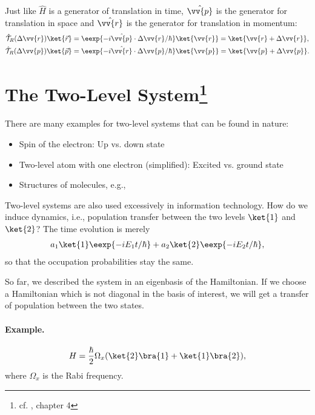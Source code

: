 				Just like $\hat{H}$ is a generator of translation in time, $\hat{\vv{p}}$ is the generator for translation in space and $\hat{\vv{r}}$ is the generator for translation in momentum:
				\begin{align}
					\hat{\mathcal{T}}_R(\Delta{\vv{r}}) \ket{\vec{r}} &= \eexp{-i\hat{\vv{p}}\cdot{\Delta\vv{r}}/{\hbar}}\ket{\vv{r}}=\ket{\vv{r}+\Delta\vv{r}},\\
					\hat{\mathcal{T}}_R(\Delta{\vv{p}}) \ket{\vec{p}} &= \eexp{-i\hat{\vv{r}}\cdot{\Delta\vv{p}}/{\hbar}}\ket{\vv{p}}=\ket{\vv{p}+\Delta\vv{p}}.
				\end{align}


	\section[The Two-Level System]{The Two-Level System\footnote{cf. \cite{cohen}, chapter 4}}

		There are many examples for two-level systems that can be found in nature:
		\begin{itemize}
			\item Spin of the electron: Up vs. down state
			\item Two-level atom with one electron (simplified): Excited vs. ground state
			\item Structures of molecules, e.g., \hyperref[fig:twostate]{}
		\end{itemize}
		Two-level systems are also used excessively in information technology.
		How do we induce dynamics, i.e., population transfer between the two levels $\ket{1}$ and $\ket{2}$? The time evolution is merely
		\begin{align}
			a_1\ket{1}\eexp{-i{E_1 t}/{\hbar}} + a_2\ket{2}\eexp{-i{E_2 t}/{\hbar}},
		\end{align}
		so that the occupation probabilities stay the same. 
		
		So far, we described the system in an eigenbasis of the Hamiltonian.
		If we choose a Hamiltonian which is not diagonal in the basis of interest, we will get a transfer of population between the two states.

				\paragraph{Example.}
					\begin{align}
						H=\frac{\hbar}{2}\Omega_x(\ket{2}\bra{1} + \ket{1}\bra{2}),
					\end{align}
					where $\Omega_x$ is the Rabi frequency.

